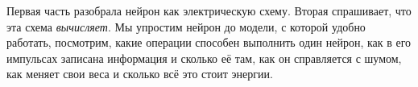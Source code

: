 \noindent Первая часть разобрала нейрон как электрическую схему. Вторая спрашивает, что эта схема \emph{вычисляет}. Мы упростим нейрон до модели, с которой удобно работать, посмотрим, какие операции способен выполнить один нейрон, как в его импульсах записана информация и сколько её там, как он справляется с шумом, как меняет свои веса и сколько всё это стоит энергии.
